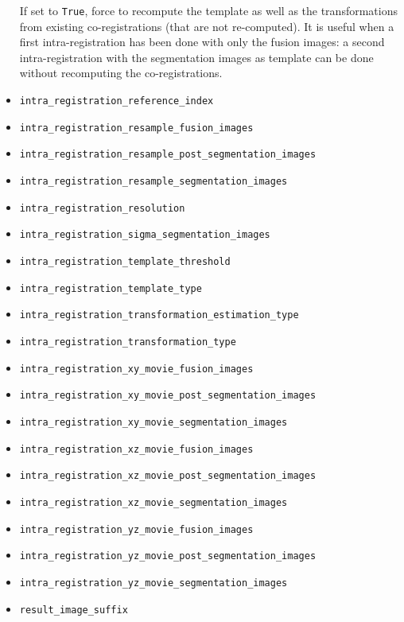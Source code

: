 \begin{itemize}
  If set to \texttt{True}, force to recompute the template as well as the
  transformations from existing co-registrations (that are not
  re-computed). It is useful when a first intra-registration has been
  done with only the fusion images: a second intra-registration with
  the segmentation images as template can be done without recomputing the co-registrations.
\item \texttt{intra\_registration\_reference\_index}
\item \texttt{intra\_registration\_resample\_fusion\_images}
\item \texttt{intra\_registration\_resample\_post\_segmentation\_images}
\item \texttt{intra\_registration\_resample\_segmentation\_images}
\item \texttt{intra\_registration\_resolution}
\item \texttt{intra\_registration\_sigma\_segmentation\_images}
\item \texttt{intra\_registration\_template\_threshold}
\item \texttt{intra\_registration\_template\_type}
\item \texttt{intra\_registration\_transformation\_estimation\_type}
\item \texttt{intra\_registration\_transformation\_type}
\item \texttt{intra\_registration\_xy\_movie\_fusion\_images}
\item \texttt{intra\_registration\_xy\_movie\_post\_segmentation\_images}
\item \texttt{intra\_registration\_xy\_movie\_segmentation\_images}
\item \texttt{intra\_registration\_xz\_movie\_fusion\_images}
\item \texttt{intra\_registration\_xz\_movie\_post\_segmentation\_images}
\item \texttt{intra\_registration\_xz\_movie\_segmentation\_images}
\item \texttt{intra\_registration\_yz\_movie\_fusion\_images}
\item \texttt{intra\_registration\_yz\_movie\_post\_segmentation\_images}
\item \texttt{intra\_registration\_yz\_movie\_segmentation\_images}
\item \texttt{result\_image\_suffix}
\end{itemize}
